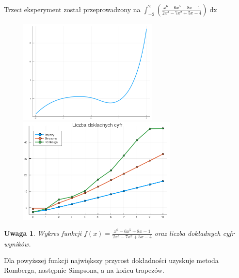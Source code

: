 \documentclass[11pt,wide]{article}
\newtheorem{remark}{Uwaga}
\begin{document}
Trzeci eksperyment został przeprowadzony na \(\displaystyle \int_{-2}^{2} \left(\frac{x^6 - 6x^5 + 8x - 1}{2x^3 - 7x^2 + 5x - 4}\right)\mathop{dx} \)
\begin{figure}[h!]
	\includegraphics[width=70mm,scale=0.5]{wym3}
	\includegraphics[width=80mm,scale=0.5]{wym_blad3}
\end{figure}
\begin{remark}
\centering
Wykres funkcji \(\displaystyle f(x) = \frac{x^6 - 6x^5 + 8x - 1}{2x^3 - 7x^2 + 5x - 4} \) oraz liczba dokładnych cyfr wyników.
\end{remark}
Dla powyższej funkcji największy przyrost dokładności uzyskuje metoda Romberga, następnie Simpsona, a na końcu trapezów. \\ \\
\end{document}

